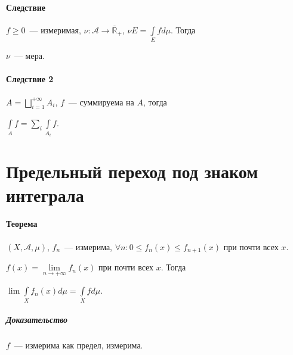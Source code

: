 \documentclass{article}
\begin{document}
    \subsection{Следствие}
    
        $f \geqslant 0$~--- измеримая, $\nu : \mathcal{A} \rightarrow \overline{\mathbb{R}}_+$, $\nu E = \int\limits_{E} f d \mu$. Тогда
        
            $\nu$~--- мера.
            
    \subsection{Следствие 2}
    
        $A = \bigsqcup\limits_{i = 1}^{+\infty} A_i$, $f$~--- суммируема на $A$, тогда 
        
            $\int\limits_{A} f = \sum\limits_{i} \int\limits_{A_i} f$.
        
\part{Предельный переход под знаком интеграла}

    \subsection{Теорема}
    
        $(X, \mathcal{A}, \mu)$, $f_n$~--- измерима, $\forall n : 0 \leqslant f_n(x) \leqslant f_{n + 1} (x)$ при почти всех $x$.
        
        $f(x) = \lim\limits_{n \rightarrow +\infty} f_n(x)$ при почти всех $x$. Тогда
        
        $\lim \int\limits_{X} f_n(x) d \mu = \int\limits_{X} f d \mu$.
        
        \subsubsection{Доказательство}
        
            $f$~--- измерима как предел, измерима.
            
\end{document}
